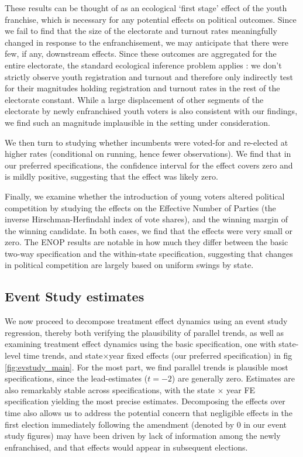 These results can be thought of as an ecological `first stage' effect
of the youth franchise, which is necessary for any potential effects
on political outcomes. Since we fail to find that the size of the
electorate and turnout rates meaningfully changed in response to the
enfranchisement, we may anticipate that there were few, if any,
downstream effects. Since these outcomes are aggregated for the entire
electorate, the standard ecological inference problem applies : we
don't strictly observe youth registration and turnout and therefore
only indirectly test for their magnitudes holding registration and
turnout rates in the rest of the electorate constant. While a large
displacement of other segments of the electorate by newly enfranchised
youth voters is also consistent with our findings, we find such an
magnitude implausible in the setting under consideration.



We then turn to studying whether incumbents were voted-for and
re-elected at higher rates (conditional on running, hence fewer
observations). We find that in our preferred specifications, the
confidence interval for the effect covers zero and is mildly positive,
suggesting that the effect was likely zero.



Finally, we examine whether the introduction of young voters altered
political competition by studying the effects on the Effective Number
of Parties (the inverse Hirschman-Herfindahl index of vote
shares), and the winning margin of the winning candidate. In both
cases, we find that the effects were very small or zero. The ENOP
results are notable in how much they differ between the basic two-way
specification and the within-state specification, suggesting that
changes in political competition are largely based on uniform swings
by state.




\subsection{Event Study estimates} %
\label{sub:event_study_results}

We now proceed to decompose treatment effect dynamics using an event
study regression, thereby both verifying the plausibility of parallel
trends, as well as examining treatment effect dynamics using the basic
specification, one with state-level time trends, and state$\times$year
fixed effects (our preferred specification) in fig
\ref{fig:evstudy_main}. For the most part, we find parallel trends is
plausible most specifications, since the lead-estimates ($t = -2$) are
generally zero. Estimates are also remarkably stable across
specifications, with the state $\times$ year FE specification yielding
the most precise estimates. Decomposing the effects over time also
allows us to address the potential concern that negligible effects in
the first election immediately following the amendment (denoted by 0
in our event study figures) may have been driven by lack of
information among the newly enfranchised, and that effects would
appear in subsequent elections.

